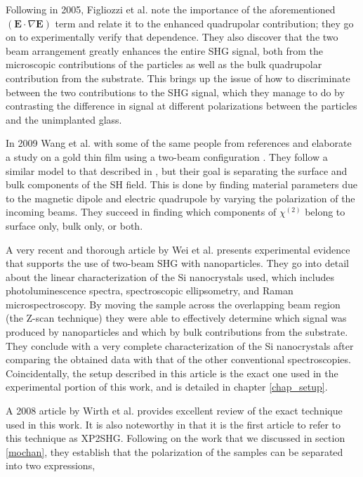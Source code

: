 \documentclass[10pt]{article}
\begin{document}
Following in 2005, Figliozzi et al. \cite{figliozzi2005single} note the importance of the aforementioned $\left(\mathbf{E}\cdot\nabla\mathbf{E}\right)$ term and relate it to the enhanced quadrupolar contribution; they go on to experimentally verify that dependence. They also discover that the two beam arrangement greatly enhances the entire SHG signal, both from the microscopic contributions of the particles as well as the bulk quadrupolar contribution from the substrate. This brings up the issue of how to discriminate between the two contributions to the SHG signal, which they manage to do by contrasting the difference in signal at different polarizations between the particles and the unimplanted glass.

In 2009 Wang et al. with some of the same people from references \cite{klein2007experiments} and \cite{feth2008second} elaborate a study on a gold thin film using a two-beam configuration \cite{wang2009surface}. They follow a similar model to that described in \cite{figliozzi2005single}, but their goal is separating the surface and bulk components of the SH field. This is done by finding material parameters due to the magnetic dipole and electric quadrupole by varying the polarization of the incoming beams. They succeed in finding which components of $\chi^{(2)}$ belong to surface only, bulk only, or both.

A very recent and thorough article \cite{PhysRevB.84.165316} by Wei et al. presents experimental evidence that supports the use of two-beam SHG with nanoparticles. They go into detail about the linear characterization of the Si nanocrystals used, which includes photoluminescence spectra, spectroscopic ellipsometry, and Raman microspectroscopy. By moving the sample across the overlapping beam region (the Z-scan technique) they were able to effectively determine which signal was produced by nanoparticles and which by bulk contributions from the substrate. They conclude with a very complete characterization of the Si nanocrystals after comparing the obtained data with that of the other conventional spectroscopies. Coincidentally, the setup described in this article is the exact one used in the experimental portion of this work, and is detailed in chapter \ref{chap_setup}.

A 2008 article \cite{wirth2008second} by Wirth et al. provides excellent review of the exact technique used in this work. It is also noteworthy in that it is the first article to refer to this technique as XP2SHG. Following on the work that we discussed in section \ref{mochan}, they establish that the polarization of the samples can be separated into two expressions,
\end{document}
